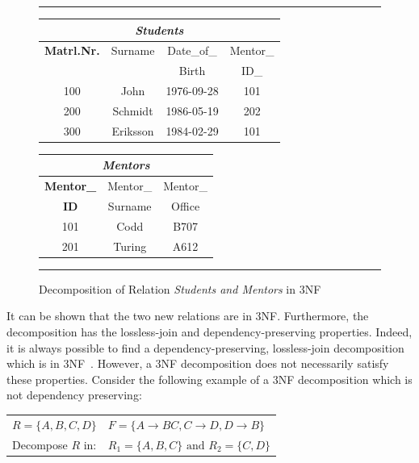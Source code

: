 \begin{figure}[h]
\hrule
\vspace{0.25cm}
\begin{minipage}[t]{0.5\linewidth}\centering
\begin{tabular}{|c|c|c|c|}
\hline
\multicolumn{4}{|c|}{\textit{Students}} \\
\hline
\textbf{Matrl.Nr.} & Surname & Date\_of\_  & Mentor\_ \\
                   &         & Birth    & ID\_     \\
\hline \hline
100 & John     & 1976-09-28 & 101 \\
200 & Schmidt  & 1986-05-19 & 202 \\
300 & Eriksson & 1984-02-29 & 101 \\
\hline
\end{tabular}
\end{minipage}
\hspace{0.5cm}
\begin{minipage}[t]{0.5\linewidth}\centering
\begin{tabular}{|c|c|c|}
\hline
\multicolumn{3}{|c|}{\textit{Mentors}} \\ \hline
 \textbf{Mentor\_} & Mentor\_  & Mentor\_ \\
 \textbf{ID}       & Surname   & Office \\
 \hline \hline
 101 & Codd   & B707 \\
 201 & Turing & A612 \\ \hline
\end{tabular}
\end{minipage}

\caption{Decomposition of Relation \textit{Students and Mentors} in 3NF}\label{alg:relsc3nf}
\hrule
\end{figure}

It can be shown that the two new relations are in 3NF. Furthermore, the 
decomposition has the lossless-join and dependency-preserving properties. Indeed, it is always 
possible to find a dependency-preserving, lossless-join decomposition which is in 3NF~\cite[Section 6.8]{bdb2}.
However, a 3NF decomposition does not necessarily satisfy these properties. Consider the following example
of a 3NF decomposition which is not dependency preserving:

\begin{center}
\begin{tabular}[h]{l l}
  $R = \{A, B, C, D\}$ & $F = \{A \rightarrow BC, C \rightarrow D, D \rightarrow B\}$ \\
  Decompose $R$ in:  & $R_1 = \{A, B, C\} \mbox{ and } R_2 = \{C,D\}$ \\ 
\end{tabular}
\end{center}

